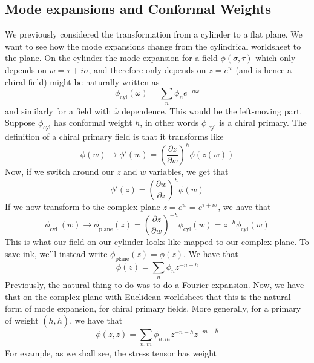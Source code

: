 \documentclass[11pt, oneside]{article}   	%
\theoremstyle{slanted}
\begin{document}
\subsection{Mode expansions and Conformal Weights}
We previously considered the 
transformation from a cylinder to 
a flat plane. We want to see how the 
mode expansions change from the 
cylindrical worldsheet to the plane. 
On the cylinder the mode 
expansion for a field $ \phi \left( \sigma, \tau  \right)  $
which only depends on $ w  = \tau + i \sigma $, 
and therefore only depends on $ z  = e ^{ w } $ (and
is hence a chiral field)
might be naturally written as 
\[
	\phi _{\text{cyl}} \left( \omega  \right)  
	  = \sum_ n \phi _ n e ^{  - n \omega } 
  \] and similarly for a field with $ \overline{ \omega } $ 
  dependence. This would be the left-moving part. 
  Suppose $ \phi _{ \text{cyl}}$ has 
  conformal weight $ h $, in other words 
  $ \phi _{\text{ cyl} } $ is a chiral primary.
  The definition of a chiral primary field 
  is that it transforms like 
\[
	\phi \left( w  \right)  \to \phi ' \left( w  \right)  
	 = \left( \frac{\partial  z }{\partial  w }   \right)^{ h } 
	 \phi \left( z \left(  w  \right)   \right)  
\] Now, if we switch around 
our $ z $ and $ w $ variables, we get that 
\[
	\phi' \left(  z  \right)  
	= \left( \frac{\partial w }{\partial  z  }   \right)^{ 
	h  } \phi \left(  w  \right)  
\] 
  If we now transform to the complex plane $ 
   z = e ^{ w }  = e ^{ \tau + i \sigma  } $, 
   we have that 
   \[
	   \phi _{ \text{cyl } } \left( w  \right)  \to \phi
	   _{\text{plane}}\left( z   \right) 
	    = \left( \frac{\partial  z }{\partial  w }   \right)  ^{ - h } 
	    \phi _{\text{cyl} } \left( w  \right)   = 
	    z ^{ - h } \phi _{\text{cyl}} \left( w  \right) 
   \] This is what 
   our field on our cylinder looks like 
   mapped to our complex plane. 
   To save ink, we'll instead 
   write $ \phi _{\text{plane}}\left(  z  \right)  =\phi\left( z \right)  $. 
   We have that 
   \[
    \phi \left(  z  \right)   = \sum _ n \phi _ n z ^{ -  n - h } 
   \] Previously, the natural 
   thing to do was to do a Fourier 
   expansion. Now, we have 
   that on the complex plane with Euclidean worldsheet 
   that this is the natural form 
   of mode expansion, for chiral primary fields. 
   More generally, for 
   a primary of weight $ \left( h , \overline{ h }  \right)   $, 
   we have that 
   \[
	   \phi \left( z, \overline{ z }  \right)  
	    =\sum _{ n , m } \phi _{ n , m } z^{ - n - h } \overline{ z } 
	    ^{ - m - \overline{ h } }
   \] For example, as 
   we shall see, the stress tensor has weight 
\end{document}
